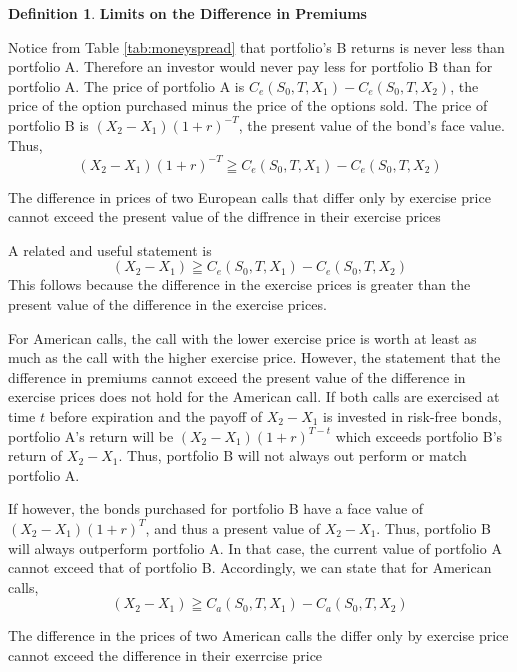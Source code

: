 \documentclass{book}
\theoremstyle{definition}
\newtheorem{definition}{Definition}[section]
\theoremstyle{remark}
\begin{document}
            \begin{definition}{\textbf{Limits on the Difference in Premiums}}
                
                Notice from Table \ref{tab:moneyspread} that portfolio's B returns is never less than portfolio A. Therefore an investor would never pay less for portfolio B than for portfolio A. The price of portfolio A is $C_e(S_0, T, X_1) - C_e(S_0, T, X_2)$, the price of the option purchased minus the price of the options sold. The price of portfolio B is $ (X_2 - X_1)(1+r)^{-T} $, the present value of the bond's face value. Thus, $$ (X_2 - X_1)(1+r)^{-T}  \geqq C_e(S_0, T, X_1) - C_e(S_0, T, X_2) $$
                
        \begin{tcolorbox}[colback=blue!5!white,colframe=blue!75!black, title=Sticky Note]
            The difference in prices of two European calls that differ only by exercise price cannot exceed the present value of the diffrence in their exercise prices 
        \end{tcolorbox}  
                
                A related and useful statement is $$ (X_2 - X_1)  \geqq C_e(S_0, T, X_1) - C_e(S_0, T, X_2) $$
                This follows because the difference in the exercise prices is greater than the present value of the difference in the exercise prices. 
                
                For American calls, the call with the lower exercise price is worth at least as much as the call with the higher exercise price. However, the statement that the difference in premiums cannot exceed the present value of the difference in exercise prices does not hold for the American call. If both calls are exercised at time $t$ before expiration and the payoff of $X_2 - X_1$ is invested in risk-free bonds, portfolio A's return will be $(X_2 - X_1)(1+r)^{T-t}$ which exceeds portfolio B's return of $X_2 - X_1$. Thus, portfolio B will not always out perform or match portfolio A.
                
                If however, the bonds purchased for portfolio B have a face value of $(X_2 - X_1)(1 + r)^T$, and thus a present value of $X_2 - X_1$. Thus, portfolio B will always outperform portfolio A. In that case, the current value of portfolio A cannot exceed that of portfolio B. Accordingly, we can state that for American calls, $$ (X_2 - X_1)  \geqq C_a(S_0, T, X_1) - C_a(S_0, T, X_2) $$
                
        \begin{tcolorbox}[colback=blue!5!white,colframe=blue!75!black, title=Sticky Note]
            The difference in the prices of two American calls the differ only by exercise price cannot exceed the difference in their exerrcise price
        \end{tcolorbox}                  
                
            \end{definition}
            
\end{document}
